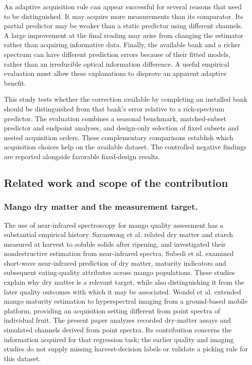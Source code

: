 \documentclass[Review,sagev,times]{sagej}
\begin{document}
An adaptive acquisition rule can appear successful for several reasons that need to be distinguished. It may acquire more measurements than its comparator. Its partial predictor may be weaker than a static predictor using different channels. A large improvement at the final reading may arise from changing the estimator rather than acquiring informative data. Finally, the available bank and a richer spectrum can have different prediction errors because of their fitted models, rather than an irreducible optical information difference. A useful empirical evaluation must allow these explanations to disprove an apparent adaptive benefit.

This study tests whether the correction available by completing an installed bank should be distinguished from that bank's error relative to a rich-spectrum predictor. The evaluation combines a seasonal benchmark, matched-subset predictor and endpoint analyses, and design-only selection of fixed subsets and nested acquisition orders. These complementary comparisons establish which acquisition choices help on the available dataset. The controlled negative findings are reported alongside favorable fixed-design results.

\subsection{Related work and scope of the contribution}
\subsubsection{Mango dry matter and the measurement target.}
The use of near-infrared spectroscopy for mango quality assessment has a substantial empirical history. Saranwong et al.\citep{saranwong2004} related dry matter and starch measured at harvest to soluble solids after ripening, and investigated their nondestructive estimation from near-infrared spectra. Subedi et al.\citep{subedi2007} examined short-wave near-infrared prediction of dry matter, maturity indicators and subsequent eating-quality attributes across mango populations. These studies explain why dry matter is a relevant target, while also distinguishing it from the later quality outcomes with which it may be associated. Wendel et al.\citep{wendel2018} extended mango maturity estimation to hyperspectral imaging from a ground-based mobile platform, providing an acquisition setting different from point spectra of individual fruit. The present paper analyzes recorded dry-matter assays and simulated channels derived from point spectra. Its contribution concerns the information acquired for that regression task; the earlier quality and imaging studies do not supply missing harvest-decision labels or validate a picking rule for this dataset.
\end{document}
